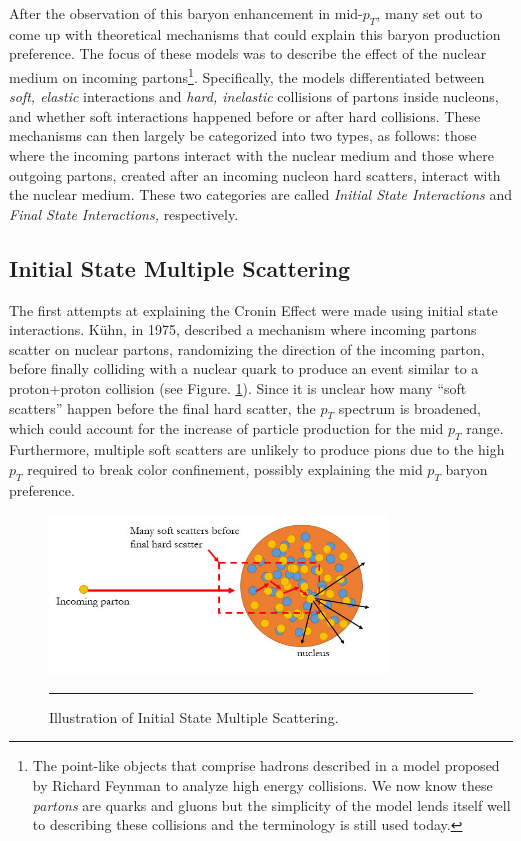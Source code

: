After the observation of this baryon enhancement in mid-$p_T$, many set out to come up with theoretical mechanisms that could explain this baryon production preference. The focus of these models was to describe the effect of the nuclear medium on incoming partons\footnote{The point-like objects that comprise hadrons described in a model proposed by Richard Feynman to analyze high energy collisions. We now know these \textit{partons} are quarks and gluons but the simplicity of the model lends itself well to describing these collisions and the terminology is still used today.}. Specifically, the models differentiated between \textit{soft, elastic} interactions and \textit{hard, inelastic} collisions of partons inside nucleons, and whether soft interactions happened before or after hard collisions. These mechanisms can then largely be categorized into two types, as follows: those where the incoming partons interact with the nuclear medium and those where outgoing partons, created after an incoming nucleon hard scatters, interact with the nuclear medium. These two categories are called \textit{Initial State Interactions} and \textit{Final State Interactions,} respectively.

\subsection{Initial State Multiple Scattering}
The first attempts at explaining the Cronin Effect were made using initial state interactions. K\"{u}hn, in 1975, described a mechanism where incoming partons scatter on nuclear partons, randomizing the direction of the incoming parton, before finally colliding with a nuclear quark to produce an event similar to a proton+proton collision \citep{PhysRevD.13.2948} (see Figure. \ref{fig:ISIscattering}). Since it is unclear how many ``soft scatters'' happen before the final hard scatter, the $p_{T}$ spectrum is broadened, which could account for the increase of particle production for the mid $p_{T}$ range. Furthermore, multiple soft scatters are unlikely to produce pions due to the high $p_T$ required to break color confinement, possibly explaining the mid $p_T$ baryon preference.
\begin{figure}[htbp!]
  \centering    
    \includegraphics[width=0.8\textwidth]{Figures/ISIscattering.jpg}
\rule{35em}{0.5pt}
  \caption[Illustration of Initial State Multiple Scattering]{Illustration of Initial State Multiple Scattering.}
  \label{fig:ISIscattering}  
\end{figure} 


